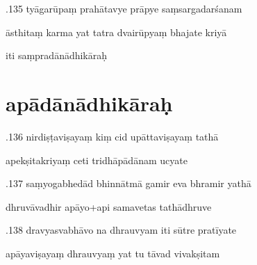 \documentclass[article,12pt,a4paper]{memoir}%
\newcounter{parCount}
\begin{document}
	  
	  \pstart {}.135 tyāgarūpaṃ prahātavye prāpye saṃsargadarśanam 
	{}
	\pend%
      

	  
	  \pstart \leavevmode%
	āsthitaṃ karma yat tatra dvairūpyaṃ bhajate kriyā 
	{}
	\pend%
      

	  
	  \pstart \leavevmode%
	iti saṃpradānādhikāraḥ
	{}
	\pend%
      
	  
	
\chapter[{apādānādhikāraḥ}][{apādānādhikāraḥ}]{ apādānādhikāraḥ}

	  
	  \pstart {}.136 nirdiṣṭaviṣayaṃ kiṃ cid upāttaviṣayaṃ tathā 
	{}
	\pend%
      

	  
	  \pstart \leavevmode%
	apekṣitakriyaṃ ceti tridhāpādānam ucyate 
	{}
	\pend%
      

	  
	  \pstart {}.137 saṃyogabhedād bhinnātmā gamir eva bhramir yathā 
	{}
	\pend%
      

	  
	  \pstart \leavevmode%
	dhruvāvadhir apāyo+api samavetas tathādhruve 
	{}
	\pend%
      

	  
	  \pstart {}.138 dravyasvabhāvo na dhrauvyam iti sūtre pratīyate 
	{}
	\pend%
      

	  
	  \pstart \leavevmode%
	apāyaviṣayaṃ dhrauvyaṃ yat tu tāvad vivakṣitam 
	{}
	\pend%
      
\end{document}
